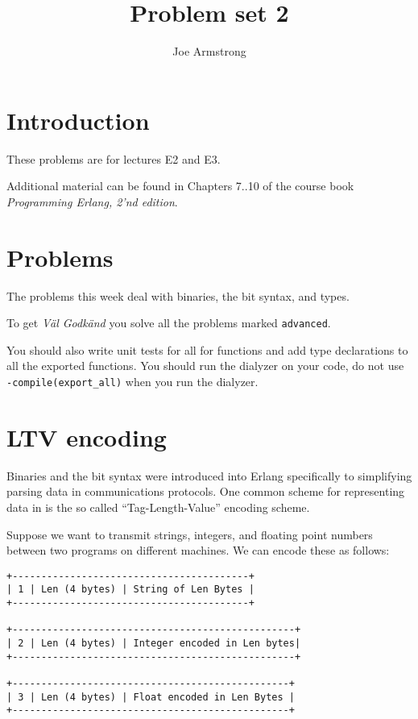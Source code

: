 \documentclass[12pt]{hitec}
\title{Problem set 2}
\author{Joe Armstrong}
\begin{document}
\maketitle

\tableofcontents

\section{Introduction}
These problems are for lectures E2 and E3.

Additional material can be found in Chapters 7..10 of the course book
{\sl Programming Erlang, 2'nd edition}.

\section{Problems}

The problems this week deal with binaries, the bit syntax, and types.

To get {\sl V\"{a}l Godk\"{a}nd} you solve all the problems marked
\verb+advanced+.

You should also write unit tests for all for functions and add type
declarations to all the exported functions. You should run the dialyzer
on your code, do not use \verb+-compile(export_all)+ when you run the dialyzer.

\section{LTV encoding}

Binaries and the bit syntax were introduced into Erlang specifically to
simplifying parsing data in communications protocols. 
One common scheme for representing data in
is the so called ``Tag-Length-Value'' encoding scheme.

Suppose we want to transmit strings, integers, and floating point numbers
between two programs on different machines. We can encode these as follows:

\begin{verbatim}
+-----------------------------------------+
| 1 | Len (4 bytes) | String of Len Bytes |
+-----------------------------------------+

+-------------------------------------------------+
| 2 | Len (4 bytes) | Integer encoded in Len bytes|
+-------------------------------------------------+

+------------------------------------------------+
| 3 | Len (4 bytes) | Float encoded in Len Bytes |
+------------------------------------------------+
\end{verbatim}
\end{document}

